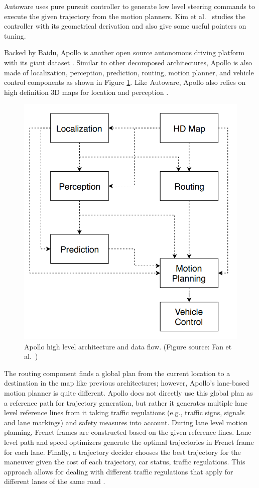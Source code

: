 Autoware uses pure pursuit controller to generate low level steering commands
to execute the given trajectory from the motion planners. Kim et al.\
\cite{Kim2013SensorbasedMP} studies the controller with its geometrical
derivation and also give some useful pointers on tuning.

Backed by Baidu, Apollo is another open source autonomous driving platform with
its giant dataset \cite{Huang2018TheAD}. Similar to other decomposed
architectures, Apollo is also made of localization, perception, prediction,
routing, motion planner, and vehicle control components as shown in Figure
\ref{figure:apollo}. Like Autoware, Apollo also relies on high definition 3D
maps for location and perception \cite{Fan2018BaiduAE}.

\begin{figure}[h]
  \centering
  \includegraphics[width=.8\textwidth]{figures/apollo.png}
  \caption[Apollo high level architecture]{Apollo high level architecture and
    data flow. (Figure source: Fan et al.\ \cite{Fan2018BaiduAE})}
  \label{figure:apollo}
\end{figure}

The routing component finds a global plan from the current location
to a destination in the map like previous architectures; however, Apollo's
lane-based motion planner is quite different. Apollo does not directly use
this global plan as a reference path for trajectory generation, but rather it
generates multiple lane level reference lines from it taking traffic
regulations (e.g., traffic signs, signals and lane markings) and safety
measures into account. During lane level motion planning, Frenet frames are
constructed based on the given reference lines. Lane level path and speed
optimizers generate the optimal trajectories in Frenet frame for each lane.
Finally, a trajectory decider chooses the best trajectory for the maneuver
given the cost of each trajectory, car status, traffic regulations. This
approach allows for dealing with different traffic regulations that apply for
different lanes of the same road \cite{Fan2018BaiduAE}.

